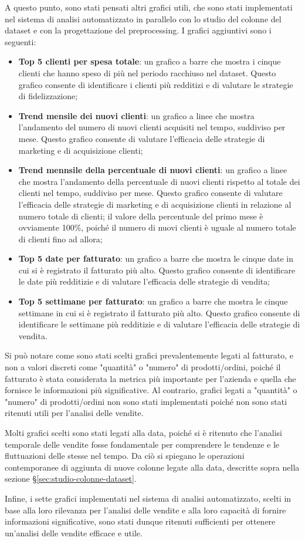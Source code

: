 A questo punto, sono stati pensati altri grafici utili, che sono stati implementati nel sistema di analisi automatizzato in parallelo con lo studio del colonne del dataset e con la progettazione del \gls{preprocessing}. I grafici aggiuntivi sono i seguenti:
\begin{itemize}
    \item \textbf{Top 5 clienti per spesa totale}: un grafico a barre che mostra i cinque clienti che hanno speso di più nel periodo racchiuso nel dataset. Questo grafico consente di identificare i clienti più redditizi e di valutare le strategie di fidelizzazione;
    \item \textbf{Trend mensile dei nuovi clienti}: un grafico a linee che mostra l'andamento del numero di nuovi clienti acquisiti nel tempo, suddiviso per mese. Questo grafico consente di valutare l'efficacia delle strategie di marketing e di acquisizione clienti;
    \item \textbf{Trend mennsile della percentuale di nuovi clienti}: un grafico a linee che mostra l'andamento della percentuale di nuovi clienti rispetto al totale dei clienti nel tempo, suddiviso per mese. Questo grafico consente di valutare l'efficacia delle strategie di marketing e di acquisizione clienti in relazione al numero totale di clienti; il valore della percentuale del primo mese è ovviamente 100\%, poiché il numero di nuovi clienti è uguale al numero totale di clienti fino ad allora;
    \item \textbf{Top 5 date per fatturato}: un grafico a barre che mostra le cinque date in cui si è registrato il fatturato più alto. Questo grafico consente di identificare le date più redditizie e di valutare l'efficacia delle strategie di vendita;
    \item \textbf{Top 5 settimane per fatturato}: un grafico a barre che mostra le cinque settimane in cui si è registrato il fatturato più alto. Questo grafico consente di identificare le settimane più redditizie e di valutare l'efficacia delle strategie di vendita.
\end{itemize}

Si può notare come sono stati scelti grafici prevalentemente legati al fatturato, e non a valori discreti come "quantità" o "numero" di prodotti/ordini, poiché il fatturato è stata considerata la metrica più importante per l'azienda e quella che fornisce le informazioni più significative. Al contrario, grafici legati a "quantità" o "numero" di prodotti/ordini non sono stati implementati poiché non sono stati ritenuti utili per l'analisi delle vendite.

Molti grafici scelti sono stati legati alla data, poiché si è ritenuto che l'analisi temporale delle vendite fosse fondamentale per comprendere le tendenze e le fluttuazioni delle stesse nel tempo. Da ciò si spiegano le operazioni contemporanee di aggiunta di nuove colonne legate alla data, descritte sopra nella sezione \S\ref{sec:studio-colonne-dataset}.

Infine, i sette grafici implementati nel sistema di analisi automatizzato, scelti in base alla loro rilevanza per l'analisi delle vendite e alla loro capacità di fornire informazioni significative, sono stati dunque ritenuti sufficienti per ottenere un'analisi delle vendite efficace e utile.

